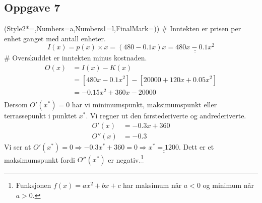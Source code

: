 \documentclass[12pt, a4paper]
{article}						%
\def\answer#1{\underline{\underline{#1}}}
\begin{document}
\subsection*{Oppgave 7}
\begin{easylist}[enumerate]
	\ListProperties(Style2*=,Numbers=a,Numbers1=l,FinalMark={)})
	# Inntekten er prisen per enhet ganget med antall enheter.
	\begin{equation*}
		I(x) = p(x) \times x = \left(480 - 0.1x\right)x = \answer{480x - 0.1x^2}
	\end{equation*}
	# Overskuddet er inntekten minus kostnaden.
	\begin{align*}
		O(x) &= I(x) - K(x) \\
		&= \left[ 480x - 0.1x^2 \right] - \left[20000+120x + 0.05x^2\right] \\
		&= \answer{-0.15x^2 + 360x - 20000}
	\end{align*}
	Dersom $O'(x^*) = 0$ har vi minimumspunkt, maksimumspunkt eller terrassepunkt i punktet $x^*$.
	Vi regner ut den førstederiverte og andrederiverte.
	\begin{align*}
		O'(x) &= -0.3x + 360 \\
		O''(x) &= -0.3
	\end{align*}
	Vi ser at $O'(x^*) = 0 \Rightarrow -0.3x^* + 360 = 0 \Rightarrow  \answer{x^* = 1200}$. Dett er et maksimumspunkt fordi $O''(x^*)$ er negativ.\footnote{Funksjonen $f(x) = ax^2 + bx + c$ har maksimum når $a < 0$ og minimum når $a > 0$.}
	
\end{easylist}
\end{document}
